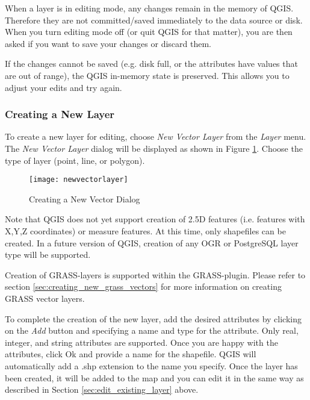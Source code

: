 
When a layer is in editing mode, any changes remain in the memory of QGIS.
Therefore they are not committed/saved immediately to the data source or disk.
When you turn editing mode off (or quit QGIS for that matter), 
you are then asked if you want to save your
changes or discard them.

If the changes cannot be saved (e.g. disk full, or the attributes have
values that are out of range), the QGIS in-memory state is preserved.  This
allows you to adjust your edits and try again.

\subsubsection{Creating a New Layer}\label{sec:create shape}

To create a new layer for editing, choose \textit{New Vector Layer} from the
\textit{Layer} menu. The \textit{New Vector Layer} dialog will be displayed as
shown in Figure \ref{fig:newvectorlayer}. Choose the type of layer (point,
line, or polygon). 

\begin{figure}[ht]
   \begin{center}
   \caption{Creating a New Vector Dialog}\label{fig:newvectorlayer}\smallskip
   \texttt{[image: newvectorlayer]}
\end{center} 
\end{figure}

Note that QGIS does not yet support creation of 2.5D
features (i.e. features with X,Y,Z coordinates) or measure features. At this
time, only shapefiles can be created. In a future version of QGIS, creation of
any OGR or PostgreSQL layer type will be supported. 

Creation of GRASS-layers is supported within the GRASS-plugin. Please refer to section
\ref{sec:creating_new_grass_vectors} for more information on creating GRASS vector 
layers.

To complete the creation of the new layer, add the desired attributes by
clicking on the \textit{Add} button and specifying a name and type for the
attribute. Only real, integer, and string attributes are supported. Once you
are happy with the attributes, click Ok and provide a name for the shapefile.
QGIS will automatically add a .shp extension to the name you specify.  Once
the layer has been created, it will be added to the map and you can edit it in
the same way as described in Section \ref{sec:edit_existing_layer} above. 

